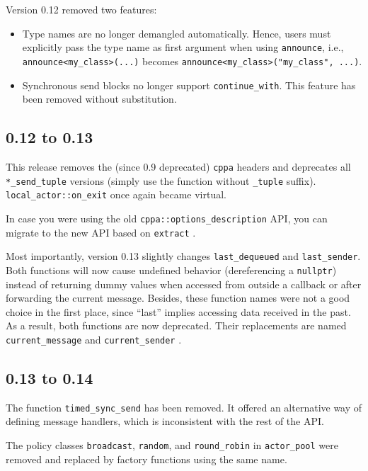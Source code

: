 Version 0.12 removed two features:

\begin{itemize}
\item Type names are no longer demangled automatically. Hence, users must
  explicitly pass the type name as first argument when using
    \lstinline^announce^, i.e., \lstinline^announce<my_class>(...)^ becomes
    \lstinline^announce<my_class>("my_class", ...)^.
\item Synchronous send blocks no longer support \lstinline^continue_with^. This
  feature has been removed without substitution.
\end{itemize}

\subsection{0.12 to 0.13}

This release removes the (since 0.9 deprecated) \lstinline^cppa^ headers and
deprecates all \lstinline^*_send_tuple^ versions (simply use the function
without \lstinline^_tuple^ suffix). \lstinline^local_actor::on_exit^ once again
became virtual.

In case you were using the old \lstinline^cppa::options_description^ API, you
can migrate to the new API based on \lstinline^extract^ .

Most importantly, version 0.13 slightly changes \lstinline^last_dequeued^ and
\lstinline^last_sender^. Both functions will now cause undefined behavior
(dereferencing a \lstinline^nullptr^) instead of returning dummy values when
accessed from outside a callback or after forwarding the current message.
Besides, these function names were not a good choice in the first place, since
``last'' implies accessing data received in the past. As a result, both
functions are now deprecated. Their replacements are named
\lstinline^current_message^ and \lstinline^current_sender^ .

\subsection{0.13 to 0.14}

The function \lstinline^timed_sync_send^ has been removed. It offered an
alternative way of defining message handlers, which is inconsistent with the
rest of the API.

The policy classes \lstinline^broadcast^, \lstinline^random^, and
\lstinline^round_robin^ in \lstinline^actor_pool^ were removed and replaced by
factory functions using the same name.

